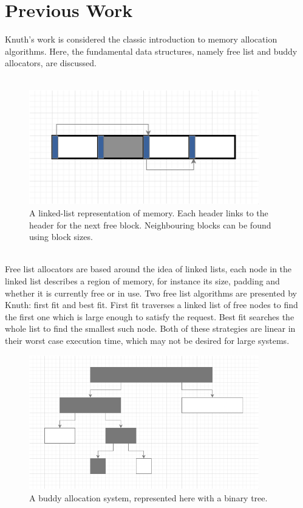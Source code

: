 \documentclass{article}
\begin{document}
\section{Previous Work}
Knuth's work \cite{knuth97} is considered the classic introduction to memory allocation algorithms. Here, the fundamental data structures, namely free list and buddy allocators, are discussed.\\
\\
\begin{figure}[htbp]
	\centering
	\includegraphics[width=10cm]{list_allocator}
	\captionsetup{width=10cm}
	\caption{A linked-list representation of memory. Each header links to the header for the next free block. Neighbouring blocks can be found using block sizes.}
\end{figure}
\\
Free list allocators are based around the idea of linked lists, each node in the linked list describes a region of memory, for instance its size, padding and whether it is currently free or in use. Two free list algorithms are presented by Knuth: first fit and best fit. First fit traverses a linked list of free nodes to find the first one which is large enough to satisfy the request. Best fit searches the whole list to find the smallest such node. Both of these strategies are linear in their worst case execution time, which may not be desired for large systems.\\
\pagebreak
\begin{figure}[htbp]
	\centering
	\includegraphics[width=10cm]{buddy_allocator}
	\captionsetup{width=10cm}
	\caption{A buddy allocation system, represented here with a binary tree.}
\end{figure}
\end{document}
